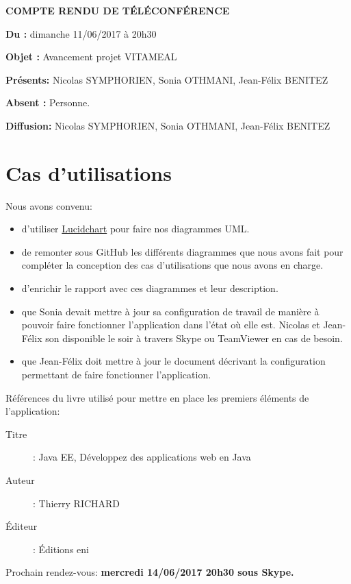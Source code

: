 \documentclass[11pt,a4paper,french,twoside,openright]{article}
\begin{document}
\pagestyle{fancy}

\begin{center}\bfseries\Huge
COMPTE RENDU DE TÉLÉCONFÉRENCE
\end{center}

\textbf{Du      :} dimanche 11/06/2017 à 20h30

\textbf{Objet   :} Avancement projet VITAMEAL

\textbf{Présents:} Nicolas SYMPHORIEN, Sonia OTHMANI, Jean-Félix BENITEZ

\textbf{Absent :} Personne.

\textbf{Diffusion:} Nicolas SYMPHORIEN, Sonia OTHMANI, Jean-Félix BENITEZ

\hrulefill

\section{Cas d'utilisations}

Nous avons convenu:
\begin{itemize}
\item d'utiliser \href{http://www.lucidchart.com}{Lucidchart} pour faire nos diagrammes UML.
\item de remonter sous GitHub les différents diagrammes que nous avons fait pour compléter la conception des cas d'utilisations que nous avons en charge.
\item d'enrichir le rapport avec ces diagrammes et leur description.
\item que Sonia devait mettre à jour sa configuration de travail de manière à pouvoir faire fonctionner l'application dans l'état où elle est. Nicolas et Jean-Félix son disponible le soir à travers Skype ou TeamViewer en cas de besoin.
\item que Jean-Félix doit mettre à jour le document décrivant la configuration permettant de faire fonctionner l'application.
\end{itemize}

Références du livre utilisé pour mettre en place les premiers éléments de l'application:
\begin{description}
\item[Titre]: Java EE, Développez des applications web en Java
\item[Auteur]: Thierry RICHARD
\item[Éditeur]: Éditions eni
\end{description}

Prochain rendez-vous: \textbf{mercredi 14/06/2017 20h30 sous Skype.}

\label{LastPage}
\end{document}
